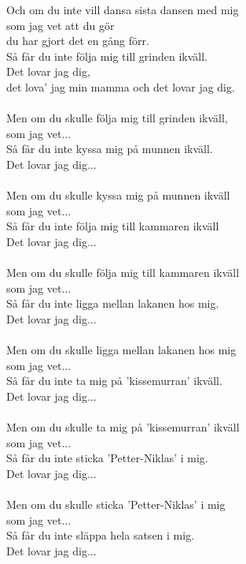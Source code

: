 \vspace{10pt}
Och om du inte vill dansa sista dansen med mig\\
som jag vet att du gör\\
du har gjort det en gång förr.\\
Så får du inte följa mig till grinden ikväll.\\
Det lovar jag dig,\\
det lova' jag min mamma och det lovar jag dig.\\
\\
Men om du skulle följa mig till grinden ikväll,\\
som jag vet...\\
Så får du inte kyssa mig på munnen ikväll.\\
Det lovar jag dig...\\
\\
Men om du skulle kyssa mig på munnen ikväll \\
som jag vet...\\
Så får du inte följa mig till kammaren ikväll\\
Det lovar jag dig...\\
\\
Men om du skulle följa mig till kammaren ikväll\\
som jag vet...\\
Så får du inte ligga mellan lakanen hos mig.\\
Det lovar jag dig...\\
\\
Men om du skulle ligga mellan lakanen hos mig\\
som jag vet...\\
Så får du inte ta mig på 'kissemurran' ikväll.\\
Det lovar jag dig...\\
\\
Men om du skulle ta mig på 'kissemurran' ikväll\\
som jag vet...\\
Så får du inte sticka 'Petter-Niklas' i mig.\\
Det lovar jag dig...\\
\\
Men om du skulle sticka 'Petter-Niklas' i mig\\
som jag vet...\\
Så får du inte släppa hela satsen i mig.\\
Det lovar jag dig...\\
\\
